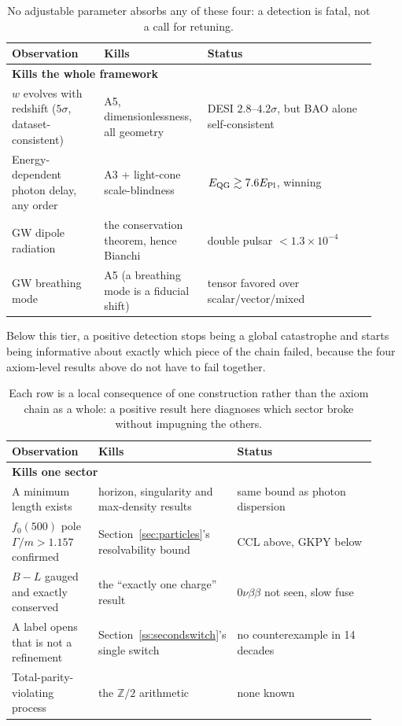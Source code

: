 \documentclass[aps,prd,twocolumn,superscriptaddress,nofootinbib]{revtex4-2}
\begin{document}
\begin{table}[h]
\centering
\small
\begin{tabular}{p{0.24\linewidth}p{0.24\linewidth}p{0.44\linewidth}}
\toprule
Observation & Kills & Status \\
\midrule
\multicolumn{3}{l}{\textbf{Kills the whole framework}}\\
$w$ evolves with redshift ($5\sigma$, dataset-consistent) & A5, dimensionlessness, all geometry & DESI $2.8$--$4.2\sigma$, but BAO alone self-consistent \\
Energy-dependent photon delay, any order & A3 + light-cone scale-blindness & $E_{\rm QG}\gtrsim7.6E_{\rm Pl}$, winning \\
GW dipole radiation & the conservation theorem, hence Bianchi & double pulsar $<1.3\times10^{-4}$ \\
GW breathing mode & A5 (a breathing mode is a fiducial shift) & tensor favored over scalar/vector/mixed \\
\bottomrule
\end{tabular}
\caption{No adjustable parameter absorbs any of these four: a detection is fatal, not a call for retuning.}
\label{tab:falsify-whole}
\end{table}
\FloatBarrier

Below this tier, a positive detection stops being a global catastrophe
and starts being informative about exactly which piece of the chain
failed, because the four axiom-level results above do not have to fail
together.

\begin{table}[h]
\centering
\small
\begin{tabular}{p{0.24\linewidth}p{0.28\linewidth}p{0.40\linewidth}}
\toprule
Observation & Kills & Status \\
\midrule
\multicolumn{3}{l}{\textbf{Kills one sector}}\\
A minimum length exists & horizon, singularity and max-density results & same bound as photon dispersion \\
$f_0(500)$ pole $\Gamma/m>1.157$ confirmed & Section~\ref{sec:particles}'s resolvability bound & CCL above, GKPY below \\
$B{-}L$ gauged and exactly conserved & the ``exactly one charge'' result & $0\nu\beta\beta$ not seen, slow fuse \\
A label opens that is not a refinement & Section~\ref{ss:secondswitch}'s single switch & no counterexample in 14 decades \\
Total-parity-violating process & the $\mathbb{Z}/2$ arithmetic & none known \\
\bottomrule
\end{tabular}
\caption{Each row is a local consequence of one construction rather than the axiom chain as a whole: a positive result here diagnoses which sector broke without impugning the others.}
\label{tab:falsify-sector}
\end{table}
\FloatBarrier
\end{document}
